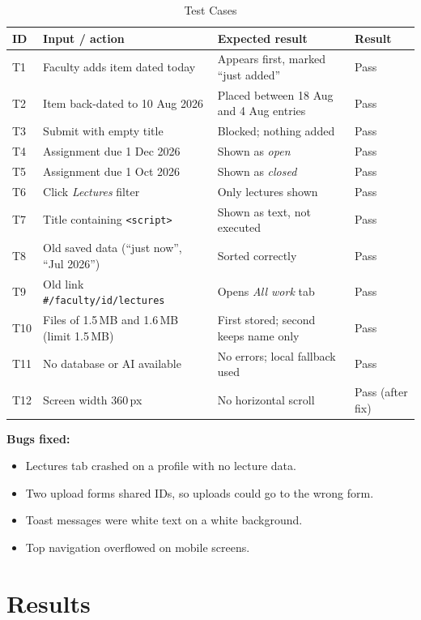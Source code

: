 \documentclass[conference]{IEEEtran}
\begin{document}
\begin{table}[!t]
\caption{Test Cases}
\label{tab:tests}
\centering\footnotesize
\begin{tabularx}{\textwidth}{@{}l Y Y l@{}}
\toprule
\textbf{ID} & \textbf{Input / action} & \textbf{Expected result} & \textbf{Result}\\
\midrule
T1 & Faculty adds item dated today & Appears first, marked ``just added'' & Pass\\
T2 & Item back-dated to 10 Aug 2026 & Placed between 18 Aug and 4 Aug entries & Pass\\
T3 & Submit with empty title & Blocked; nothing added & Pass\\
T4 & Assignment due 1 Dec 2026 & Shown as \emph{open} & Pass\\
T5 & Assignment due 1 Oct 2026 & Shown as \emph{closed} & Pass\\
T6 & Click \emph{Lectures} filter & Only lectures shown & Pass\\
T7 & Title containing \verb|<script>| & Shown as text, not executed & Pass\\
T8 & Old saved data (``just now'', ``Jul 2026'') & Sorted correctly & Pass\\
T9 & Old link \texttt{\#/faculty/id/lectures} & Opens \emph{All work} tab & Pass\\
T10 & Files of 1.5\,MB and 1.6\,MB (limit 1.5\,MB) & First stored; second keeps name only & Pass\\
T11 & No database or AI available & No errors; local fallback used & Pass\\
T12 & Screen width 360\,px & No horizontal scroll & Pass (after fix)\\
\bottomrule
\end{tabularx}
\end{table}

\textbf{Bugs fixed:}
\begin{itemize}
  \item Lectures tab crashed on a profile with no lecture data.
  \item Two upload forms shared IDs, so uploads could go to the wrong form.
  \item Toast messages were white text on a white background.
  \item Top navigation overflowed on mobile screens.
\end{itemize}

\section{Results}
\end{document}
